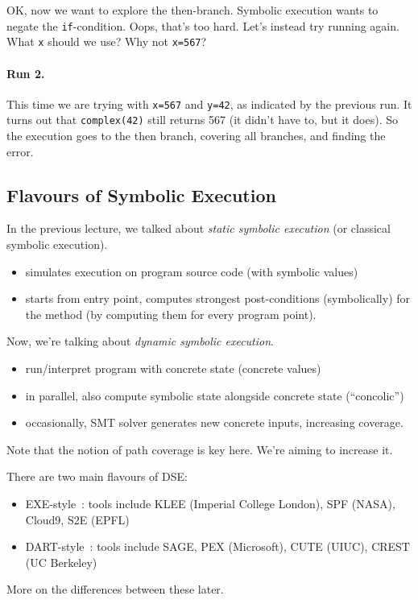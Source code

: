 \documentclass[11pt]{article}
\begin{document}
OK, now we want to explore the then-branch. Symbolic execution wants to negate the
\texttt{if}-condition. Oops, that's too hard. Let's instead try running again.
What \texttt{x} should we use? Why not \texttt{x=567}?

\paragraph{Run 2.} This time we are trying with \texttt{x=567} and \texttt{y=42},
as indicated by the previous run. It turns out that \texttt{complex(42)} still returns
567 (it didn't have to, but it does). So the execution goes to the then branch,
covering all branches, and finding the error.

\subsection*{Flavours of Symbolic Execution}
In the previous lecture, we talked about \emph{static symbolic execution} (or classical symbolic execution).
\begin{itemize}[noitemsep]
\item simulates execution on program source code (with symbolic values)
\item starts from entry point, computes strongest post-conditions (symbolically) for the method (by computing them for every program point).
\end{itemize}
Now, we're talking about \emph{dynamic symbolic execution}.
\begin{itemize}[noitemsep]
    \item run/interpret program with concrete state (concrete values)
    \item in parallel, also compute symbolic state alongside concrete state (``concolic'')
    \item occasionally, SMT solver generates new concrete inputs, increasing coverage.
\end{itemize}
Note that the notion of path coverage is key here. We're aiming to increase it.

There are two main flavours of DSE:
\begin{itemize}[noitemsep]
\item EXE-style~\cite{cadar06:_exe}: tools include KLEE (Imperial College London), SPF (NASA), Cloud9, S2E (EPFL)
  \item DART-style~\cite{godefroid05:_dart}: tools include SAGE, PEX (Microsoft), CUTE (UIUC), CREST (UC Berkeley)
\end{itemize}
More on the differences between these later.
\end{document}
